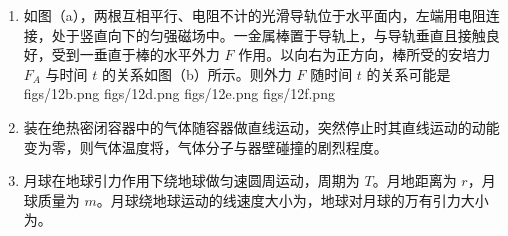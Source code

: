 \documentclass[\gkver]{gaokaozhenti}
\begin{document}
\begin{enumerate}
{带电体所带的总电荷量为 $q + q - 2q = 0$。在匀强电场 $E_{a}$ 中，三个点电荷所受电场力的矢量和为

$F_{a} = qE_{a} + qE_{a} - 2qE_{a} = 0$

在非匀强电场 $E_{b}$ 中，由图可知电场线在下方较密，$-2q$ 所在处的电场强度大于两个 $+q$ 所在处的电场强度，$-2q$ 受到的向下的电场力大于两个 $+q$ 受到的向上的电场力的合力，所以 $F_{b} \neq 0$。

故选 D。
}

\item
如图（a），两根互相平行、电阻不计的光滑导轨位于水平面内，左端用电阻连接，处于竖直向下的匀强磁场中。一金属棒置于导轨上，与导轨垂直且接触良好，受到一垂直于棒的水平外力 $F$ 作用。以向右为正方向，棒所受的安培力 $F_{A}$ 与时间 $t$ 的关系如图（b）所示。则外力 $F$ 随时间 $t$ 的关系可能是
{figs/12b.png}
{figs/12d.png}
{figs/12e.png}
{figs/12f.png}

\item
装在绝热密闭容器中的气体随容器做直线运动，突然停止时其直线运动的动能变为零，则气体温度将，气体分子与器壁碰撞的剧烈程度。

\item
月球在地球引力作用下绕地球做匀速圆周运动，周期为 $T$。月地距离为 $r$，月球质量为 $m$。月球绕地球运动的线速度大小为\newline{}，地球对月球的万有引力大小为。
\end{enumerate}
\end{document}
